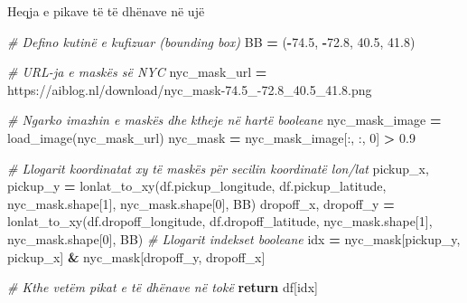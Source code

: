 \documentclass[
  ignorenonframetext,
]{beamer}
\newenvironment{Shaded}{\begin{snugshade}}{\end{snugshade}}
\newcommand{\CommentTok}[1]{\textcolor[rgb]{0.56,0.35,0.01}{\textit{#1}}}
\newcommand{\ControlFlowTok}[1]{\textcolor[rgb]{0.13,0.29,0.53}{\textbf{#1}}}
\newcommand{\DecValTok}[1]{\textcolor[rgb]{0.00,0.00,0.81}{#1}}
\newcommand{\FloatTok}[1]{\textcolor[rgb]{0.00,0.00,0.81}{#1}}
\newcommand{\NormalTok}[1]{#1}
\newcommand{\OperatorTok}[1]{\textcolor[rgb]{0.81,0.36,0.00}{\textbf{#1}}}
\newcommand{\StringTok}[1]{\textcolor[rgb]{0.31,0.60,0.02}{#1}}
\begin{document}
\begin{frame}[fragile]{Heqja e pikave të të dhënave në ujë}
\protect\hypertarget{heqja-e-pikave-tuxeb-tuxeb-dhuxebnave-nuxeb-ujuxeb-10}{}

\begin{Shaded}
\begin{Highlighting}[]
    \CommentTok{\# Defino kutinë e kufizuar (bounding box)}
\NormalTok{    BB }\OperatorTok{=}\NormalTok{ (}\OperatorTok{{-}}\FloatTok{74.5}\NormalTok{, }\OperatorTok{{-}}\FloatTok{72.8}\NormalTok{, }\FloatTok{40.5}\NormalTok{, }\FloatTok{41.8}\NormalTok{)}

    \CommentTok{\# URL{-}ja e maskës së NYC}
\NormalTok{    nyc\_mask\_url }\OperatorTok{=} \StringTok{\textquotesingle{}https://aiblog.nl/download/nyc\_mask{-}74.5\_{-}72.8\_40.5\_41.8.png\textquotesingle{}}

    \CommentTok{\# Ngarko imazhin e maskës dhe ktheje në hartë booleane}
\NormalTok{    nyc\_mask\_image }\OperatorTok{=}\NormalTok{ load\_image(nyc\_mask\_url)}
\NormalTok{    nyc\_mask }\OperatorTok{=}\NormalTok{ nyc\_mask\_image[:, :, }\DecValTok{0}\NormalTok{] }\OperatorTok{\textgreater{}} \FloatTok{0.9}

    \CommentTok{\# Llogarit koordinatat xy të maskës për secilin koordinatë lon/lat}
\NormalTok{    pickup\_x, pickup\_y }\OperatorTok{=}\NormalTok{ lonlat\_to\_xy(df.pickup\_longitude, df.pickup\_latitude, }
\NormalTok{                                      nyc\_mask.shape[}\DecValTok{1}\NormalTok{], nyc\_mask.shape[}\DecValTok{0}\NormalTok{], BB)}
\NormalTok{    dropoff\_x, dropoff\_y }\OperatorTok{=}\NormalTok{ lonlat\_to\_xy(df.dropoff\_longitude, df.dropoff\_latitude, }
\NormalTok{                                      nyc\_mask.shape[}\DecValTok{1}\NormalTok{], nyc\_mask.shape[}\DecValTok{0}\NormalTok{], BB)}
    \CommentTok{\# Llogarit indekset booleane}
\NormalTok{    idx }\OperatorTok{=}\NormalTok{ nyc\_mask[pickup\_y, pickup\_x] }\OperatorTok{\&}\NormalTok{ nyc\_mask[dropoff\_y, dropoff\_x]}

    \CommentTok{\# Kthe vetëm pikat e të dhënave në tokë}
    \ControlFlowTok{return}\NormalTok{ df[idx]}
\end{Highlighting}
\end{Shaded}
\end{frame}
\end{document}
